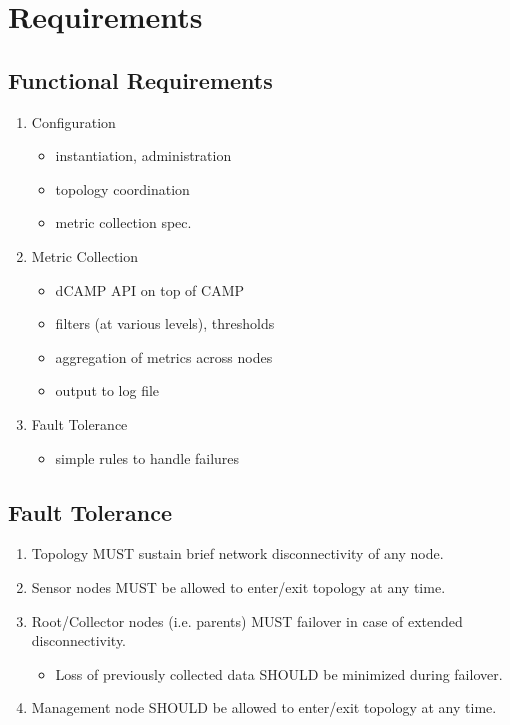 \section{Requirements}

\subsection{Functional Requirements}

\begin{enumerate}

\item Configuration
  \begin{itemize}
  \item instantiation, administration
  \item topology coordination
  \item metric collection spec.
  \end{itemize}

\item Metric Collection
  \begin{itemize}
  \item dCAMP API on top of CAMP
  \item filters (at various levels), thresholds
  \item aggregation of metrics across nodes
  \item output to log file
  \end{itemize}

\item Fault Tolerance
  \begin{itemize}
  \item simple rules to handle failures
  \end{itemize}

\end{enumerate}

\subsection{Fault Tolerance}

\begin{enumerate}

\item Topology MUST sustain brief network disconnectivity of any node.

\item Sensor nodes MUST be allowed to enter/exit topology at any time.

\item Root/Collector nodes (i.e. parents) MUST failover in case of extended disconnectivity.
  \begin{itemize}
  \item Loss of previously collected data SHOULD be minimized during failover.
  \end{itemize}

\item Management node SHOULD be allowed to enter/exit topology at any time.

\end{enumerate}

